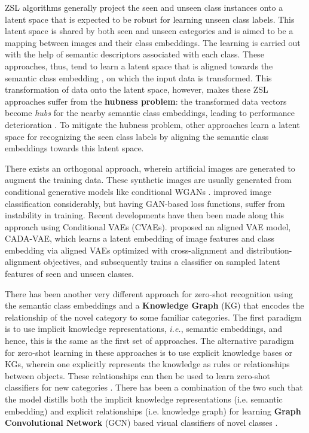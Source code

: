 \documentclass{article}
\begin{document}
ZSL algorithms generally project the seen and unseen class instances onto a latent space that is expected to be robust for learning unseen class labels. 
This latent space is shared by both seen and unseen categories and is aimed to be a mapping between images and their class embeddings. 
The learning is carried out with the help of semantic descriptors associated with each class. 
These approaches, thus, tend to learn a latent space that is aligned towards the semantic class embedding \citep{sabr10, sabr12, sabr14, sabr17, sabr19, sabr23}, on which the input data is transformed. 
This transformation of data onto the latent space, however, makes these ZSL approaches suffer from the \textbf{hubness problem}: 
the transformed data vectors become \textit{hubs} for the nearby semantic class embeddings, leading to performance deterioration \citep{sabr18, sabr16, sabr9}. 
To mitigate the hubness problem, 
other approaches \citep{sabr29, sabr5, sabr31, sabr18, akanksha} learn a latent space for recognizing the seen class labels by aligning the semantic class embeddings towards this latent space. 

There exists an orthogonal approach, wherein artificial images \citep{cada23} are generated to augment the training data. 
These synthetic images are usually generated from conditional generative models like conditional WGANs \citep{sabr25}. 
\citet{sabr25} improved image classification considerably, but having GAN-based loss functions, suffer from instability in training. 
Recent developments have then been made along this approach using Conditional VAEs (CVAEs). 
\citet{edgar} proposed an aligned VAE model, CADA-VAE, which 
learns a latent embedding of image features and class embedding via aligned VAEs optimized with cross-alignment and distribution-alignment objectives, 
and subsequently trains a classifier on sampled latent features of seen and unseen classes. 

There has been another very different approach for zero-shot recognition using the semantic class embeddings and a \textbf{Knowledge Graph}  (KG)
that encodes the relationship of the novel category to some familiar categories. 
The ﬁrst paradigm is to use implicit knowledge representations, \textit{i.e.}, semantic embeddings, and hence, this is the same as the first set of approaches.
The alternative paradigm for zero-shot learning in these approaches is to use explicit knowledge bases or KGs, 
wherein one explicitly represents the knowledge as rules or relationships between objects. 
These relationships can then be used to learn zero-shot classifiers for new categories \citep{gcn33}. 
There has been a combination of the two such that the model distills both the implicit knowledge representations (i.e. semantic embedding) and 
explicit relationships (i.e. knowledge graph) for learning \textbf{Graph Convolutional Network} (GCN) based visual classiﬁers of novel classes \citep{abhinav}.
\end{document}
